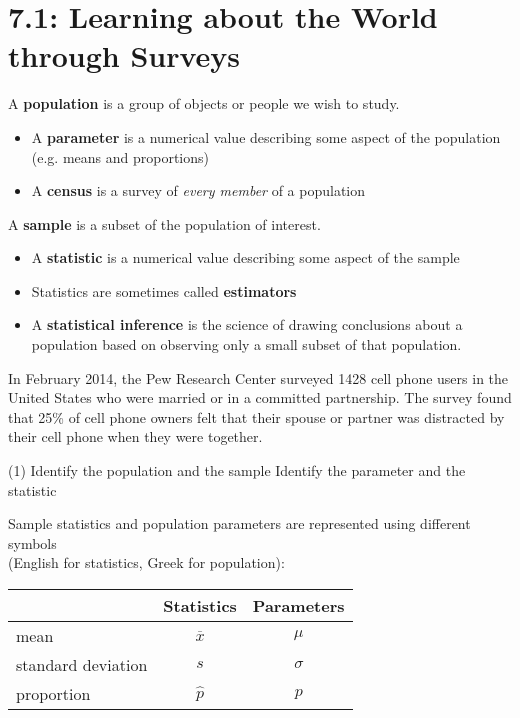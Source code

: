 \documentclass[../mathNotesPreamble]{subfiles}
\begin{document}
  \section{7.1: Learning about the World through Surveys}

    \begin{defn*}
      A \textbf{population} is a group of objects or people we wish to study.
      \begin{itemize}
        \item A \textbf{parameter} is a numerical value describing some aspect of the population\\ (e.g. means and proportions)
        \item A \textbf{census} is a survey of \emph{every member} of a population
      \end{itemize}
      A \textbf{sample} is a subset of the population of interest.
      \begin{itemize}
        \item A \textbf{statistic} is a numerical value describing some aspect of the sample
        \item Statistics are sometimes called \textbf{estimators}
        \item A \textbf{statistical inference} is the science of drawing conclusions about a population based on observing only a small subset of that population.
      \end{itemize}
    \end{defn*}

    \begin{ex*}
      In February 2014, the Pew Research Center surveyed 1428 cell phone users in the United States who were married or in a committed partnership. The survey found that 25\% of cell phone owners felt that their spouse or partner was distracted by their cell phone when they were together.
    \end{ex*}

    \begin{extasks}[after-item-skip=\stretch{1}](1)
      \task Identify the population and the sample
      \task Identify the parameter and the statistic
    \end{extasks}
    \pagebreak

    \noindent
    Sample statistics and population parameters are represented using different symbols\\ (English for statistics, Greek for population):
    \begin{center}
      \begin{tabular}{@{}l*{2}{c}@{}}\toprule
        & Statistics & Parameters \\\midrule
        mean & $\overline{x}$ & $\mu$ \\
        standard deviation & $s$ & $\sigma$\\
        proportion & $\hat{p}$ & $p$\\\bottomrule
      \end{tabular}
    \end{center}
\end{document}
